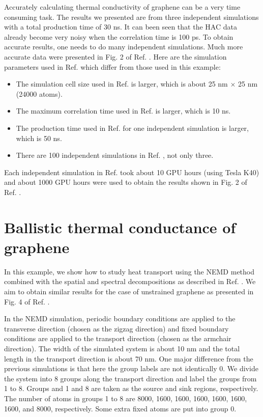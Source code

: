 \documentclass[12pt,a4paper]{report}
\begin{document}
Accurately calculating thermal conductivity of graphene can be a very time consuming task. The results we presented are from three independent simulations with a total production time of 30 ns. It can been seen that the HAC data already become very noisy when the correlation time is 100 ps. To obtain accurate results, one needs to do many independent simulations. Much more accurate data were presented in Fig. 2 of Ref. \cite{fan2017prb}. Here are the simulation parameters used in Ref. \cite{fan2017prb} which differ from those used in this example:
\begin{itemize}
\item The simulation cell size used in Ref. \cite{fan2017prb} is larger, which is about 25 nm $\times$ 25 nm (24000 atoms).
\item The maximum correlation time used in Ref. \cite{fan2017prb} is larger, which is 10 ns.
\item The production time used in Ref. \cite{fan2017prb} for one independent simulation is larger, which is 50 ns.
\item There are 100 independent simulations in Ref. \cite{fan2017prb}, not only three.
\end{itemize}

Each independent simulation in Ref. \cite{fan2017prb} took about 10 GPU hours (using Tesla K40) and about 1000 GPU hours were used to obtain the results shown in Fig. 2 of Ref. \cite{fan2017prb}.


\section{Ballistic thermal conductance of graphene}

In this example, we show how to study heat transport using the NEMD method combined with the spatial and spectral decompositions as described in Ref. \cite{fan2017prb}. We aim to obtain similar results for the case of unstrained graphene as presented in Fig. 4 of Ref. \cite{fan2017prb}.

In the NEMD simulation, periodic boundary conditions are applied to the transverse direction (chosen as the zigzag direction) and fixed boundary conditions are applied to the transport direction (chosen as the armchair direction). The width of the simulated system is about 10 nm and the total length in the transport direction is about 70 nm. One major difference from the previous simulations is that here the group labels are not identically 0. We divide the system into 8 groups along the transport direction and label the groups from 1 to 8. Groups and 1 and 8 are taken as the source and sink regions, respectively. The number of atoms in groups 1 to 8 are 8000, 1600, 1600, 1600, 1600, 1600, 1600, and 8000, respectively. Some extra fixed atoms are put into group 0. 
\end{document}
